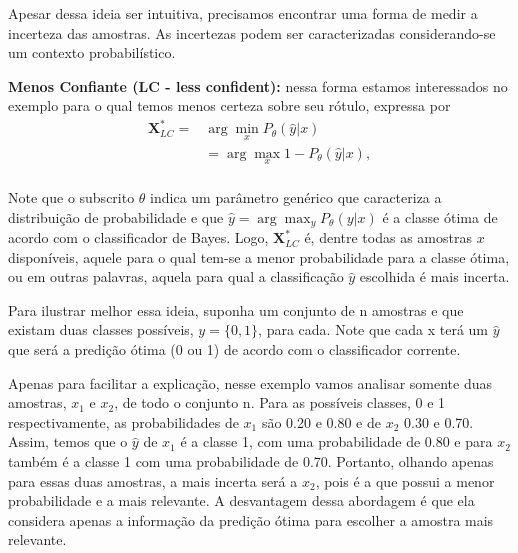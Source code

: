 Apesar dessa ideia ser intuitiva, precisamos encontrar uma forma de medir a incerteza das amostras. 
As incertezas podem ser caracterizadas considerando-se um contexto probabilístico.

\textbf{Menos Confiante (LC - less confident):} nessa forma estamos interessados no exemplo para o qual temos menos certeza sobre seu rótulo, expressa por
\begin{align*}
\textbf{X}^*_{LC} = &\arg\min_{x} P_{\theta}  (\hat{y}\lvert x)\\
& = \arg\max_{x} 1 - P_{\theta}  (\hat{y}\lvert x),\\
\end{align*}

Note que o subscrito $\theta$ indica um parâmetro genérico que caracteriza a distribuição de probabilidade e que $\hat{y} = \displaystyle \arg\max_{y} P_{\theta} (y\lvert x)$ é a classe ótima de acordo com o classificador de Bayes. Logo, $\textbf{X}^*_{LC}$ é, dentre todas as amostras $x$ disponíveis, aquele para o qual tem-se a menor probabilidade para a classe ótima, ou em outras palavras, aquela para qual a classificação $\hat{y}$ escolhida é mais incerta. 



Para ilustrar melhor essa ideia, suponha um conjunto de n amostras e que existam duas classes possíveis, $y = \{0,1\}$, para cada. Note que cada x terá um $\hat{y}$ que será a predição ótima (0 ou 1) de acordo com o classificador corrente. 

Apenas para facilitar a explicação, nesse exemplo vamos analisar somente duas amostras, $x_1$ e $x_2$, de todo o conjunto n. Para as possíveis classes, 0 e 1 respectivamente, as probabilidades de $x_1$ são 0.20 e 0.80 e de $x_2$ 0.30 e 0.70. Assim, temos que o $\hat{y}$ de $x_1$ é a classe 1, com uma probabilidade de 0.80 e para $x_2$ também é a classe 1 com uma probabilidade de 0.70. Portanto, olhando apenas para essas duas amostras, a mais incerta será a $x_2$, pois é a que possui a menor probabilidade e a mais relevante. A desvantagem dessa abordagem é que ela considera apenas a informação da predição ótima para escolher a amostra mais relevante.  

